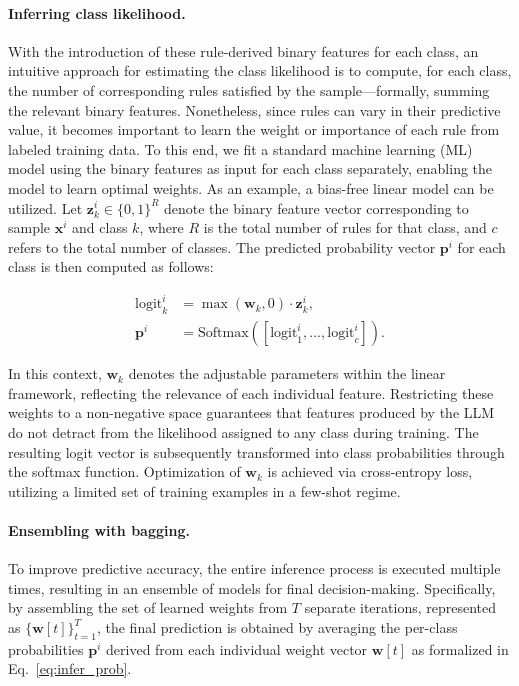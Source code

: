 \paragraph{Inferring class likelihood.} With the introduction of these rule-derived binary features for each class, an intuitive approach for estimating the class likelihood is to compute, for each class, the number of corresponding rules satisfied by the sample—formally, summing the relevant binary features. Nonetheless, since rules can vary in their predictive value, it becomes important to learn the weight or importance of each rule from labeled training data. To this end, we fit a standard machine learning (ML) model using the binary features as input for each class separately, enabling the model to learn optimal weights. As an example, a bias-free linear model can be utilized. Let $\mathbf{z}_k^i \in \{0, 1\}^R$ denote the binary feature vector corresponding to sample $\mathbf{x}^i$ and class $k$, where $R$ is the total number of rules for that class, and $c$ refers to the total number of classes. The predicted probability vector $\mathbf{p}^i$ for each class is then computed as follows:

\begin{align}
\text{logit}_k^i &= \max(\mathbf{w}_k, 0) \cdot \mathbf{z}_k^i, \nonumber \\
\mathbf{p}^i &= \text{Softmax}({[\text{logit}_{1}^i, ..., \text{logit}_{c}^i]}). \label{eq:infer_prob}
\end{align}

In this context, $\mathbf{w}_k$ denotes the adjustable parameters within the linear framework, reflecting the relevance of each individual feature. Restricting these weights to a non-negative space guarantees that features produced by the LLM do not detract from the likelihood assigned to any class during training. The resulting logit vector is subsequently transformed into class probabilities through the softmax function. Optimization of $\mathbf{w}_k$ is achieved via cross-entropy loss, utilizing a limited set of training examples in a few-shot regime.

\vspace*{-0.12in}
\paragraph{Ensembling with bagging.} To improve predictive accuracy, the entire inference process is executed multiple times, resulting in an ensemble of models for final decision-making. Specifically, by assembling the set of learned weights from $T$ separate iterations, represented as $\{\mathbf{w}[t]\}_{t=1}^T$, the final prediction is obtained by averaging the per-class probabilities $\mathbf{p}^i$ derived from each individual weight vector $\mathbf{w}[t]$ as formalized in Eq.~\ref{eq:infer_prob}.

